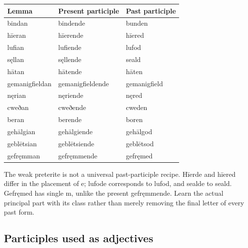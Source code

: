 \par\begingroup
\fontsize{10.5}{13.2}\selectfont
\setlength{\LTleft}{0pt}\setlength{\LTright}{\fill}
\noindent
\begin{tabular}{@{}>{\raggedright\arraybackslash}p{37.45mm}>{\raggedright\arraybackslash}p{45.21mm}>{\raggedright\arraybackslash}p{35.71mm}@{}}
\toprule
\textbf{Lemma} & \textbf{Present participle} & \textbf{Past participle} \\
\midrule
bindan & bindende & bunden \\
hīeran & hīerende & hīered \\
lufian & lufiende & lufod \\
sęllan & sęllende & seald \\
hātan & hātende & hāten \\
gemanigfieldan & gemanigfieldende & gemanigfield \\
nęrian & nęriende & nęred \\
cweðan & cweðende & cweden \\
beran & berende & boren \\
gehālgian & gehālgiende & gehālgod \\
geblētsian & geblētsiende & geblētsod \\
gefręmman & gefręmmende & gefręmed \\
\bottomrule
\end{tabular}
\par\endgroup

The weak preterite is not a universal past-participle recipe. Hīerde and hīered differ in the placement of e; lufode corresponds to lufod, and sealde to seald. Gefręmed has single m, unlike the present gefręmmende. Learn the actual principal part with its class rather than merely removing the final letter of every past form.

\subsection*{Participles used as adjectives}

